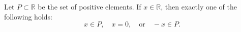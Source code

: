Let $P \subset \mathbb{R}$ be the set of positive elements. If $x \in \mathbb{R}$, then exactly one of the following holds:
\begin{equation*}
x \in P, \quad x = 0, \quad \text{or} \quad -x \in P.
\end{equation*}
